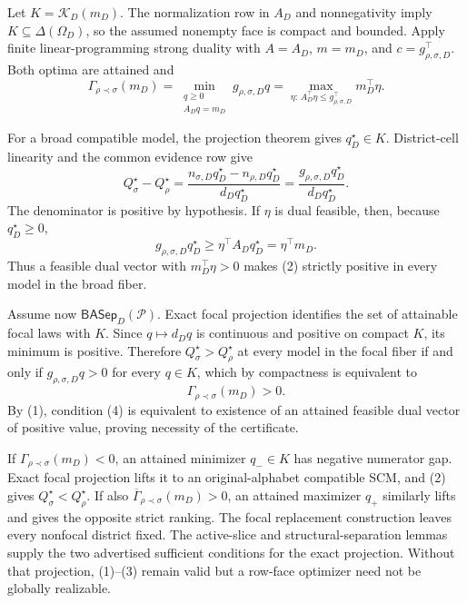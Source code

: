 Let \(K=\mathcal K_D(m_D)\). The normalization row in \(A_D\) and nonnegativity imply \(K\subseteq\Delta(\Omega_D)\), so the assumed nonempty face is compact and bounded. Apply finite linear-programming strong duality with \(A=A_D\), \(m=m_D\), and \(c=g_{\rho,\sigma,D}^\top\). Both optima are attained and
\[
\Gamma_{\rho\prec\sigma}(m_D)
=\min_{\substack{q\geq0\\A_Dq=m_D}}g_{\rho,\sigma,D}q
=\max_{\eta:\,A_D^\top\eta\leq g_{\rho,\sigma,D}^\top}m_D^\top\eta.\tag{1}
\]

For a broad compatible model, the projection theorem gives \(q_D^\star\in K\). District-cell linearity and the common evidence row give
\[
Q_\sigma^\star-Q_\rho^\star
=\frac{n_{\sigma,D}q_D^\star-n_{\rho,D}q_D^\star}{d_Dq_D^\star}
=\frac{g_{\rho,\sigma,D}q_D^\star}{d_Dq_D^\star}.\tag{2}
\]
The denominator is positive by hypothesis. If \(\eta\) is dual feasible, then, because \(q_D^\star\geq0\),
\[
g_{\rho,\sigma,D}q_D^\star
\geq \eta^\top A_Dq_D^\star
=\eta^\top m_D.\tag{3}
\]
Thus a feasible dual vector with \(m_D^\top\eta>0\) makes (2) strictly positive in every model in the broad fiber.

Assume now \(\mathsf{BASep}_D(\mathcal P)\). Exact focal projection identifies the set of attainable focal laws with \(K\). Since \(q\mapsto d_Dq\) is continuous and positive on compact \(K\), its minimum is positive. Therefore \(Q_\sigma^\star>Q_\rho^\star\) at every model in the focal fiber if and only if \(g_{\rho,\sigma,D}q>0\) for every \(q\in K\), which by compactness is equivalent to
\[
\Gamma_{\rho\prec\sigma}(m_D)>0.\tag{4}
\]
By (1), condition (4) is equivalent to existence of an attained feasible dual vector of positive value, proving necessity of the certificate.

If \(\Gamma_{\rho\prec\sigma}(m_D)<0\), an attained minimizer \(q_-\in K\) has negative numerator gap. Exact focal projection lifts it to an original-alphabet compatible SCM, and (2) gives \(Q_\sigma^\star<Q_\rho^\star\). If also
\(\overline\Gamma_{\rho\prec\sigma}(m_D)>0\), an attained maximizer \(q_+\) similarly lifts and gives the opposite strict ranking. The focal replacement construction leaves every nonfocal district fixed. The active-slice and structural-separation lemmas supply the two advertised sufficient conditions for the exact projection. Without that projection, (1)--(3) remain valid but a row-face optimizer need not be globally realizable.
